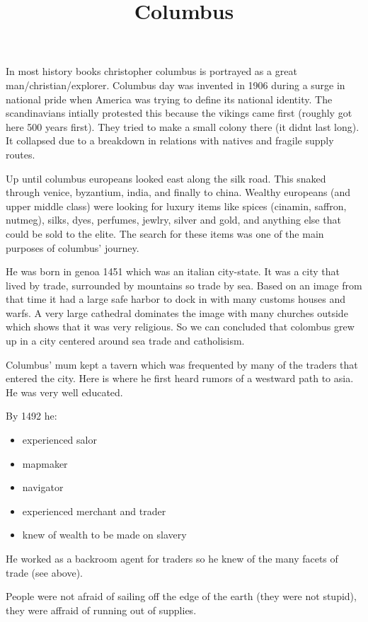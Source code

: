 \documentclass{article}
\begin{document}
\title{Columbus}
\maketitle
In most history books christopher columbus is portrayed as a great man/christian/explorer. Columbus day was invented in 1906 during a surge in national pride when America was trying to define its national identity. The scandinavians intially protested this because the vikings came first (roughly got here 500 years first). They tried to make a small colony there (it didnt last long). It collapsed due to a breakdown in relations with natives and fragile supply routes.

Up until columbus europeans looked east along the silk road. This snaked through venice, byzantium, india, and finally to china. Wealthy europeans (and upper middle class) were looking for luxury items like spices (cinamin, saffron, nutmeg), silks, dyes, perfumes, jewlry, silver and gold, and anything else that could be sold to the elite. The search for these items was one of the main purposes of columbus' journey.

He was born in genoa 1451 which was an italian city-state. It was a city that lived by trade, surrounded by mountains so trade by sea. Based on an image from that time it had a large safe harbor to dock in with many customs houses and warfs. A very large cathedral dominates the image with many churches outside which shows that it was very religious. So we can concluded that colombus grew up in a city centered around sea trade and catholisism.

Columbus' mum kept a tavern which was frequented by many of the traders that entered the city. Here is where he first heard rumors of a westward path to asia. He was very well educated.

By 1492 he:
\begin{itemize}
	\item experienced salor
	\item mapmaker
	\item navigator
	\item experienced merchant and trader
	\item knew of wealth to be made on slavery
\end{itemize}

He worked as a backroom agent for traders so he knew of the many facets of trade (see above).

People were not afraid of sailing off the edge of the earth (they were not stupid), they were affraid of running out of supplies.
\end{document}
